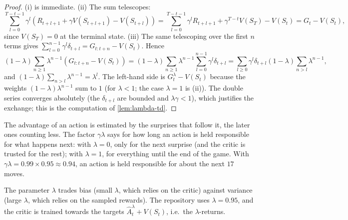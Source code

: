 \begin{proof}
  (i) is immediate. (ii) The sum telescopes:
  \begin{equation*}
    \sum_{l=0}^{T-t-1} \gamma^l \left( R_{t+l+1} + \gamma V(S_{t+l+1}) -
    V(S_{t+l}) \right) = \sum_{l=0}^{T-t-1} \gamma^l R_{t+l+1} +
    \gamma^{T-t} V(S_T) - V(S_t) = G_t - V(S_t),
  \end{equation*}
  since $V(S_T) = 0$ at the terminal state. (iii) The same telescoping over
  the first $n$ terms gives $\sum_{l=0}^{n-1} \gamma^l \delta_{t+l} =
  G_{t:t+n} - V(S_t)$. Hence
  \begin{equation*}
    (1 - \lambda) \sum_{n \geq 1} \lambda^{n-1} \left( G_{t:t+n} - V(S_t)
    \right)
    = (1 - \lambda) \sum_{n \geq 1} \lambda^{n-1} \sum_{l=0}^{n-1}
      \gamma^l \delta_{t+l}
    = \sum_{l \geq 0} \gamma^l \delta_{t+l} (1 - \lambda) \sum_{n > l}
      \lambda^{n-1},
  \end{equation*}
  and $(1 - \lambda) \sum_{n > l} \lambda^{n-1} = \lambda^l$. The left-hand
  side is $G_t^\lambda - V(S_t)$ because the weights $(1 -
  \lambda)\lambda^{n-1}$ sum to $1$ (for $\lambda < 1$; the case
  $\lambda = 1$ is (ii)). The double series converges absolutely (the
  $\delta_{t+l}$ are bounded and $\lambda \gamma < 1$), which justifies the
  exchange; this is the computation of \cref{lem:lambda-td}.
\end{proof}

\begin{intuition}
  The advantage of an action is estimated by the surprises that follow it,
  the later ones counting less. The factor $\gamma \lambda$ says for how
  long an action is held responsible for what happens next: with $\lambda =
  0$, only for the next surprise (and the critic is trusted for the rest);
  with $\lambda = 1$, for everything until the end of the game. With
  $\gamma \lambda = 0.99 \times 0.95 \approx 0.94$, an action is held
  responsible for about the next $17$ moves.
\end{intuition}

The parameter $\lambda$ trades bias (small $\lambda$, which relies on the
critic) against variance (large $\lambda$, which relies on the sampled
rewards). The repository uses $\lambda = 0.95$, and the critic is trained
towards the targets $\hat A_t^\lambda + V(S_t)$, i.e.\ the
$\lambda$-returns.

